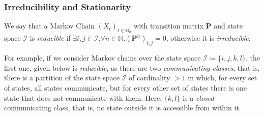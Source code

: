 		\subsubsection{Irreducibility and Stationarity}
			\begin{definition}
				We say that a Markov Chain $(X_t)_{t \in \mathbb{N}_0}$ with transition matrix 
				$\mathbf{P}$ and state space $\mathcal{I}$ is \emph{reducible} if $\exists i,j 
				\in \mathcal{I}. \forall n \in \mathbb{N}. (\mathbf{P}^n)_{i,j} = 0$, otherwise 
				it is \emph{irreducible}. 
			\end{definition}
			\begin{comment}
				If for states $i,j$ $\exists n \in \mathbb{N}. (\mathbf{P}^n){i,j} > 0$, we say 
				that state $j$ is accessible from $i$. When $j$ is accessible from $i$ and vice 
				versa, we say that the states $i,j$ \emph{communicate}. Note that sometimes, any 
				state $i$ is taken to be accessible from itself, in which case each instance of 
				$\mathbb{N}$ above should be replaced by $\mathbb{N}_0$. This notion does not 
				make more Markov chains irreducible. To see why, consider a Markov chain that is 
				reducible under the definition given above, but suppose having each state be 
				accessible from itself makes it irreducible. Then, if under the first definition 
				$i, j$ did not communicate, they must be equal, $i = j$. However, this implies 
				that $\forall i \neq j. \exists n,m \in \mathbb{N}. (\mathbf{P}^n)_{i,j} > 0 
				\land (\mathbf{P}^m)_{j,i} > 0$. Therefore, $\forall i. \exists n,m > 0. 
				(\mathbf{P}^{n+m})_{i,i} > 0$, violating the original hypothesis.
			\end{comment}
			For example, if we consider Markov chains over the state space $\mathcal{I} \coloneqq 
			\{i,j,k,l\}$, the first one, given below is \emph{reducible}, as there are two 
			\emph{communicating classes}, that is, there is a partition of the state space 
			$\mathcal{I}$ of cardinality $> 1$ in which, for every set of states, all states 
			communicate, but for every other set of states there is one state that does not 
			communicate with them. Here, $\{k,l\}$ is a \emph{closed} communicating class, that is, 
			no state outside it is accessible from within it. 
			\ \\\ \\ 
			\noindent

